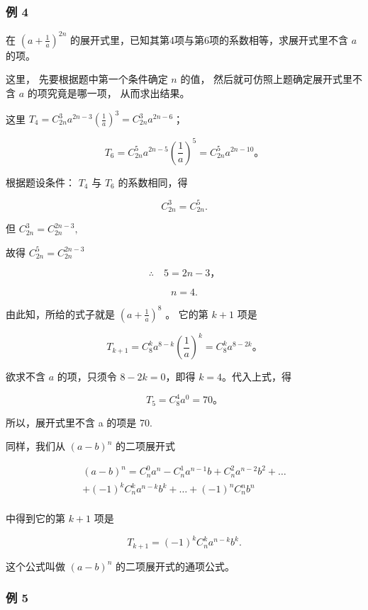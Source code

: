 \subsubsection{例 4}

在 \(\left(a + \frac{1}{a}\right)^{2n}\)
的展开式里，已知其第4项与第6项的系数相等，求展开式里不含 \(a\) 的项。

 这里， 先要根据题中第一个条件确定 \(n\) 的值，
然后就可仿照上题确定展开式里不含 \(a\) 的项究竟是哪一项， 从而求出结果。

 这里
\(T_4=C_{2n}^3a^{2n-3}\left(\frac1a\right)^3=C_{2n}^3a^{2n-6}\)；

\[
T_6=C_{2n}^5a^{2n-5}\left(\frac1a\right)^5=C_{2n}^5a^{2n-10}\text{。}
\]

根据题设条件： \(T_4\) 与 \(T_6\) 的系数相同，得

\[
C _ {2 n} ^ {3} = C _ {2 n} ^ {5}.
\]

但 \(C_{2n}^{3} = C_{2n}^{2n - 3},\)

故得 \(C_{2n}^{5} = C_{2n}^{2n - 3}\)

\[
\therefore \quad 5 = 2 n - 3\text{，}
\]

\[
n = 4.
\]

由此知，所给的式子就是 \(\left(a+\frac{1}{a}\right)^{8}\) 。 它的第
\(k+1\) 项是

\[
T_{k+1}=C_8^ka^{8-k}\left(\frac1a\right)^k=C_8^ka^{8-2k}\text{。}
\]

欲求不含 \(a\) 的项，只须令 \(8 - 2k = 0\)，即得 \(k = 4\)。代入上式，得

\[
T_5=C_8^4a^0=70\text{。}
\]

所以，展开式里不含 a 的项是 70.

同样，我们从 \((a-b)^{n}\) 的二项展开式

\[
\begin{array}{l} (a - b) ^ {n} = C _ {n} ^ {0} a ^ {n} - C _ {n} ^ {1} a ^ {n - 1} b + C _ {n} ^ {2} a ^ {n - 2} b ^ {2} + \dots \\ + (- 1) ^ {k} C _ {n} ^ {k} a ^ {n - k} b ^ {k} + \dots + (- 1) ^ {n} C _ {n} ^ {n} b ^ {n} \\ \end{array}
\]

中得到它的第 \(k + 1\) 项是

\[
\boxed {T _ {k + 1} = (- 1) ^ {k} C _ {n} ^ {k} a ^ {n - k} b ^ {k}.}
\]

这个公式叫做 \((a - b)^n\) 的二项展开式的通项公式。

\subsubsection{例 5}

